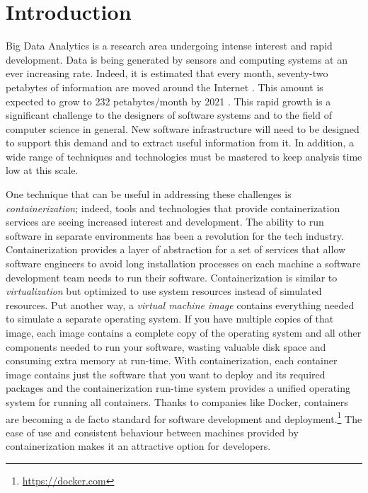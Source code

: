 
\chapter{Introduction} %

\label{Chapter1} %

Big Data Analytics is a research area undergoing intense interest and rapid development. Data is being generated by sensors and computing systems at an ever increasing rate. Indeed, it is estimated that every month, seventy-two petabytes of information are moved around the Internet \parencite{ciscoreport}. This amount is expected to grow to 232 petabytes/month by 2021 \parencite{ciscoreport}. This rapid growth is a significant challenge to the designers of software systems and to the field of computer science in general. New software infrastructure will need to be designed to support this demand and to extract useful information from it. In addition, a wide range of techniques and technologies must be mastered to keep analysis time low at this scale.

One technique that can be useful in addressing these challenges is \textit{containerization}; indeed, tools and technologies that provide containerization services are seeing increased interest and development. The ability to run software in separate environments has been a revolution for the tech industry. Containerization provides a layer of abstraction for a set of services that allow software engineers to avoid long installation processes on each machine a software development team needs to run their software. Containerization is similar to \textit{virtualization} but optimized to use system resources instead of simulated resources. Put another way, a \textit{virtual machine image} contains everything needed to simulate a separate operating system. If you have multiple copies of that image, each image contains a complete copy of the operating system and all other components needed to run your software, wasting valuable disk space and consuming extra memory at run-time. With containerization, each container image contains just the software that you want to deploy and its required packages and the containerization run-time system provides a unified operating system for running all containers. Thanks to companies like Docker, containers are becoming a de facto standard for software development and deployment.\footnote{\href{https://docker.com}{https://docker.com}} The ease of use and consistent behaviour between machines provided by containerization makes it an attractive option for developers.

